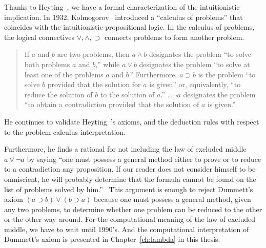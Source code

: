Thanks to Heyting~\cite{heyting1930}, we have a formal
characterization of the intuitionistic implication.
In 1932, Kolmogorov~\cite{kolmogorov1932} introduced a ``calculus of problems''
that coincides with the intuitionistic propositional logic.
In the calculus of problems, the logical connectives $\vee, \wedge,
\supset$ connects problems to form another problem.
 \begin{quote}
  If $a$ and $b$ are two problems, then $a\land b$ designates the
  problem ``to solve both problems $a$ and $b$,'' while $a\lor b$
  designates the problem ``to solve at least one of the problems $a$ and
  $b$.''  Furthermore, $a\supset b$ is the problem ``to solve $b$
  provided that the solution for $a$ is given'' or, equivalently, ``to
  reduce the solution of $b$ to the solution of
  $a$.''  \ldots $\neg a$ designates the problem ``to obtain a
  contradiction provided that the solution of $a$ is
  given.''~\cite[p.~329]{kolmogorov1932}
 \end{quote}
 He continues to validate Heyting~\cite{heyting1930}'s axioms, and the
 deduction rules with respect to the problem calculus interpretation.

 Furthermore, he finds a rational for not including the law of excluded
 middle $a\lor \neg a$ by saying ``one must possess a general method
 either to prove or to reduce to a contradiction any proposition.  If
 our reader does not consider himself to be omniscient, he will probably
 determine that the formula cannot be found on the list of problems
 solved by him.''~\cite{kolmogorov1932}
 This argument is enough to reject Dummett's axiom $(a\supset b)\lor
 (b\supset a)$ because one must possess a general method, given any two
 problems, to
 determine whether
 one problem can be reduced to the other or the other way around.
 For the computational meaning of the law of excluded middle, we have to
 wait until 1990's.
 And the computational interpretation of Dummett's axiom is
 presented in Chapter~\ref{ch:lambda} in this thesis.

